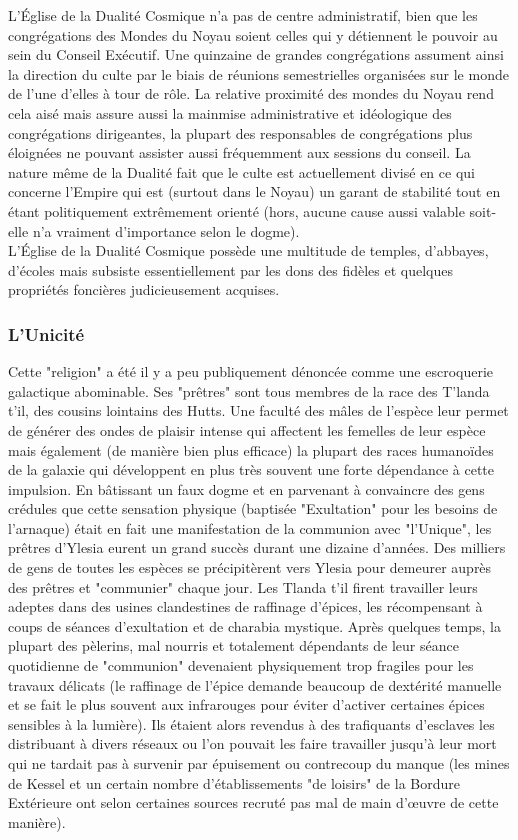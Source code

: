 \documentclass[twoside]{article}
\begin{document}
L'Église de la Dualité Cosmique n'a pas de centre administratif, bien que les congrégations des Mondes du Noyau soient celles qui y détiennent le pouvoir au sein du Conseil Exécutif. Une quinzaine de grandes congrégations assument ainsi la direction du culte par le biais de réunions semestrielles organisées sur le monde de l'une d'elles à tour de rôle. La relative proximité des mondes du Noyau rend cela aisé mais assure aussi la mainmise administrative et idéologique des congrégations dirigeantes, la plupart des responsables de congrégations plus éloignées ne pouvant assister aussi fréquemment aux sessions du conseil.
La nature même de la Dualité fait que le culte est actuellement divisé en ce qui concerne l'Empire qui est (surtout dans le Noyau) un garant de stabilité tout en étant politiquement extrêmement orienté (hors, aucune cause aussi valable soit-elle n'a vraiment d'importance selon le dogme).\\

L'Église de la Dualité Cosmique possède une multitude de temples, d'abbayes, d'écoles mais subsiste essentiellement par les dons des fidèles et quelques propriétés foncières judicieusement acquises.

\subsubsection{L'Unicité}
Cette "religion" a été il y a peu publiquement dénoncée comme une escroquerie galactique abominable. Ses "prêtres" sont tous membres de la race des T'landa t'il, des cousins lointains des Hutts. Une faculté des mâles de l'espèce leur permet de générer des ondes de plaisir intense qui affectent les femelles de leur espèce mais également (de manière bien plus efficace) la plupart des races humanoïdes de la galaxie qui développent en plus très souvent une forte dépendance à cette impulsion. En bâtissant un faux dogme et en parvenant à convaincre des gens crédules que cette sensation physique (baptisée "Exultation" pour les besoins de l'arnaque) était en fait une manifestation de la communion avec "l'Unique", les prêtres d'Ylesia eurent un grand succès durant une dizaine d'années. Des milliers de gens de toutes les espèces se précipitèrent vers Ylesia pour demeurer auprès des prêtres et "communier" chaque jour. Les Tlanda t'il firent travailler leurs adeptes dans des usines clandestines de raffinage d'épices, les récompensant à coups de séances d'exultation et de charabia mystique. Après quelques temps, la plupart des pèlerins, mal nourris et totalement dépendants de leur séance quotidienne de "communion" devenaient physiquement trop fragiles pour les travaux délicats (le raffinage de l'épice demande beaucoup de dextérité manuelle et se fait le plus souvent aux infrarouges pour éviter d'activer certaines épices sensibles à la lumière). Ils étaient alors revendus à des trafiquants d'esclaves les distribuant à divers réseaux ou l'on pouvait les faire travailler jusqu'à leur mort qui ne tardait pas à survenir par épuisement ou contrecoup du manque (les mines de Kessel et un certain nombre d'établissements "de loisirs" de la Bordure Extérieure ont selon certaines sources recruté pas mal de main d'œuvre de cette manière).\\
\end{document}
